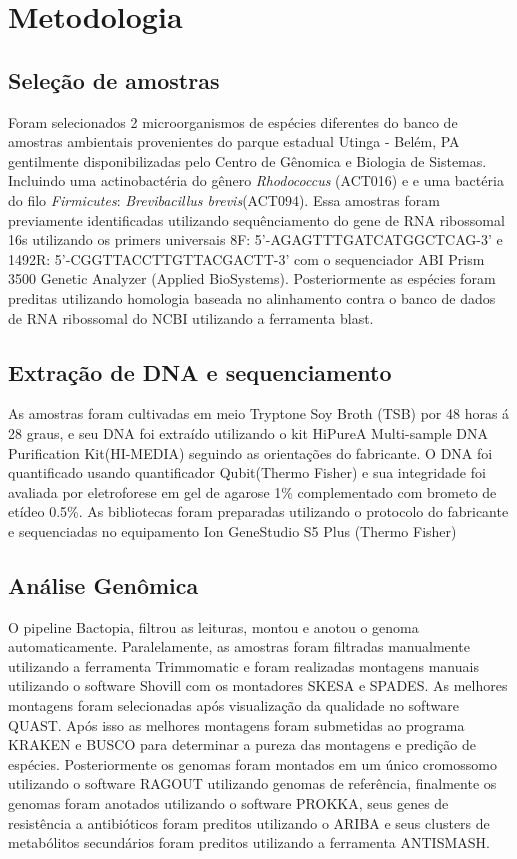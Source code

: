 \chapter{Metodologia}
\section{Seleção de amostras}
Foram selecionados 2 microorganismos de espécies diferentes do banco de amostras ambientais provenientes
do parque estadual Utinga - Belém, PA gentilmente disponibilizadas pelo Centro de Gênomica e Biologia de Sistemas.
Incluindo uma actinobactéria do gênero \textit{Rhodococcus} (ACT016) e e uma bactéria do filo \textit{Firmicutes}: \textit{Brevibacillus brevis}(ACT094).
Essa amostras foram previamente identificadas utilizando sequênciamento do gene de RNA ribossomal 16s
utilizando os primers universais 8F: 5'-AGAGTTTGATCATGGCTCAG-3' e 1492R: 5'-CGGTTACCTTGTTACGACTT-3' com o sequenciador 
ABI Prism 3500 Genetic Analyzer (Applied BioSystems). Posteriormente as espécies foram preditas utilizando
homologia baseada no alinhamento contra o banco de dados de RNA ribossomal do NCBI utilizando a ferramenta
blast.

\section{Extração de DNA e sequenciamento}
As amostras foram cultivadas em meio Tryptone Soy Broth (TSB) por 48 horas á 28 graus, e
seu DNA foi extraído utilizando o kit HiPureA Multi-sample DNA Purification Kit(HI-MEDIA) seguindo as orientações
do fabricante. O DNA foi quantificado usando quantificador Qubit(Thermo Fisher) e sua integridade foi 
avaliada por eletroforese em gel de agarose 1\% complementado com brometo de etídeo 0.5\%.
As bibliotecas foram preparadas utilizando o protocolo do fabricante e sequenciadas no equipamento
Ion GeneStudio S5 Plus (Thermo Fisher)

\section{Análise Genômica}
O pipeline Bactopia, filtrou as leituras, montou e anotou o genoma automaticamente.
Paralelamente, as amostras foram filtradas manualmente utilizando a ferramenta Trimmomatic
e foram realizadas montagens manuais utilizando o software Shovill com os montadores SKESA e SPADES.
As melhores montagens foram selecionadas após visualização da qualidade no software QUAST. 
Após isso as melhores montagens foram submetidas ao programa KRAKEN e BUSCO para determinar a pureza
das montagens e predição de espécies. Posteriormente os genomas foram montados em um único cromossomo
utilizando o software RAGOUT utilizando genomas de referência, finalmente os genomas foram anotados utilizando o software
PROKKA, seus genes de resistência a antibióticos foram preditos utilizando o ARIBA e seus clusters de metabólitos
secundários foram preditos utilizando a ferramenta ANTISMASH.

